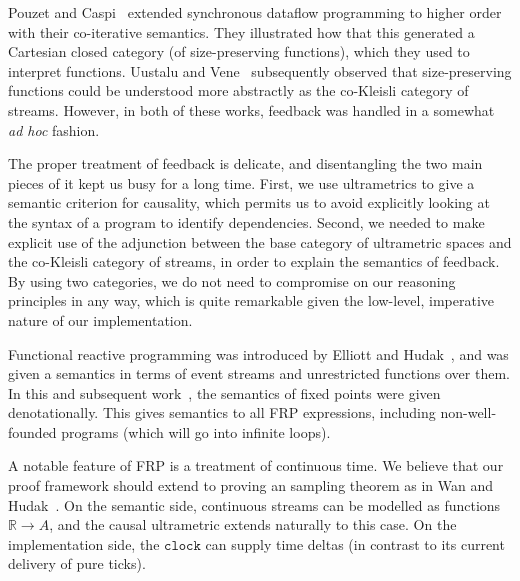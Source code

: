 \documentclass[nocopyrightspace,preprint]{sigplanconf}
\newcommand{\term}[1]{\ensuremath{\mathtt{{#1}}}}
\begin{document}

Pouzet and Caspi~\cite{coiterative} extended synchronous dataflow
programming to higher order with their co-iterative semantics. They
illustrated how that this generated a Cartesian closed category (of
size-preserving functions), which they used to interpret
functions. Uustalu and Vene~\cite{essence-dataflow} subsequently
observed that size-preserving functions could be understood more
abstractly as the co-Kleisli category of streams. However, in both of
these works, feedback was handled in a somewhat \emph{ad hoc} fashion.

The proper treatment of feedback is delicate, and disentangling the
two main pieces of it kept us busy for a long time. First, we use
ultrametrics to give a semantic criterion for causality, which permits
us to avoid explicitly looking at the syntax of a program to identify
dependencies. Second, we needed to make explicit use of the adjunction
between the base category of ultrametric spaces and the co-Kleisli
category of streams, in order to explain the semantics of feedback.
By using two categories, we do not need to compromise on our reasoning
principles in any way, which is quite remarkable given the low-level,
imperative nature of our implementation.

Functional reactive programming was introduced by Elliott and
Hudak~\cite{fran}, and was given a semantics in terms of event streams
and unrestricted functions over them. In this and subsequent
work~\cite{courtney-thesis}, the semantics of fixed points were given
denotationally. This gives semantics to all FRP expressions, including
non-well-founded programs (which will go into infinite loops). 

A notable feature of FRP is a treatment of continuous
time. We believe that our proof framework should extend to proving an
sampling theorem as in Wan and Hudak~\cite{frp-first-principles}.  On
the semantic side, continuous streams can be modelled as functions
$\mathbb{R} \to A$, and the causal ultrametric extends naturally to
this case. On the implementation side, the \term{clock} can supply
time deltas (in contrast to its current delivery of pure ticks).
\end{document}
